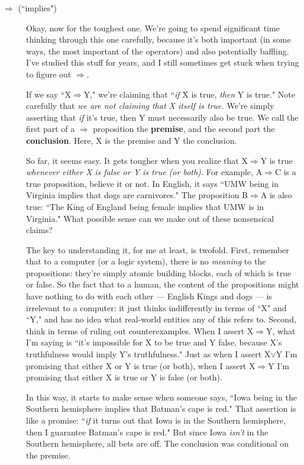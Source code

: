 \begin{description}
\item[$\Rightarrow$ (``implies")] Okay, now for the toughest one. We're
going to spend significant time thinking through this one carefully,
because it's both important (in some ways, the most important of the
operators) and also potentially baffling. I've studied this stuff for
years, and I still sometimes get stuck when trying to figure out
$\Rightarrow$.

If we say ``X$\Rightarrow$Y," we're claiming that ``\textit{if} X is true,
\textit{then} Y is true." Note carefully that \textit{we are not claiming
that X itself is true.} We're simply asserting that \textit{if} it's true,
then Y must necessarily also be true. We call the first part of a
$\Rightarrow$ proposition the \textbf{premise}, and the second part the
\textbf{conclusion}. Here, X is the premise and Y the conclusion.

So far, it seems easy. It gets tougher when you realize that
X$\Rightarrow$Y is true \textit{whenever either X is false or Y is true
(or both).} For example, A$\Rightarrow$C is a true proposition, believe
it or not. In English, it says ``UMW being in Virginia implies that dogs
are carnivores." The proposition B$\Rightarrow$A is also true: ``The
King of England being female implies that UMW is in Virginia." What possible
sense can we make out of these nonsensical claims?

The key to understanding it, for me at least, is twofold. First, remember
that to a computer (or a logic system), there is no \textit{meaning} to the
propositions: they're simply atomic building blocks, each of which is true
or false. So the fact that to a human, the content of the propositions
might have nothing to do with each other --- English Kings and dogs --- is
irrelevant to a computer: it just thinks indifferently in terms of ``X" and
``Y," and has no idea what real-world entities any of this refers to.
Second, think in terms of ruling out counterexamples. When I assert
X$\Rightarrow$Y, what I'm saying is ``it's impossible for X to be true
and Y false, because X's truthfulness would imply Y's truthfulness." Just
as when I assert X$\vee$Y I'm promising that either X or Y is true (or
both), when I assert X$\Rightarrow$Y I'm promising that either X is true
or Y is false (or both).

In this way, it starts to make sense when someone says, ``Iowa being in
the Southern hemisphere implies that Batman's cape is red." That assertion
is like a promise: ``\textit{if} it turns out that Iowa is in the Southern
hemisphere, then I guarantee Batman's cape is red." But since Iowa
\textit{isn't} in the Southern hemisphere, all bets are off. The
conclusion was conditional on the premise.


\end{description}
